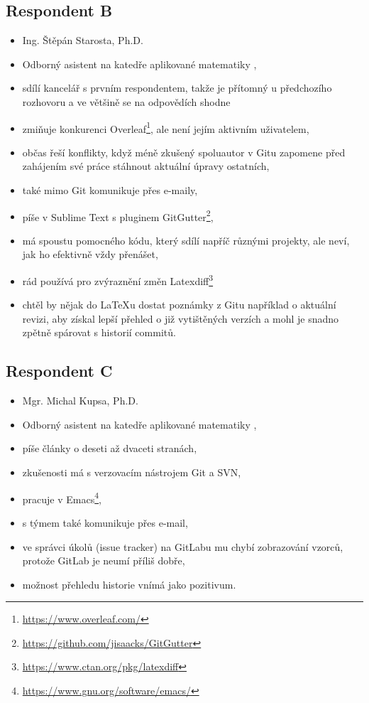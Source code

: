 \subsection{Respondent B}

\begin{itemize}
	\item Ing. Štěpán Starosta, Ph.D.
	\item Odborný asistent na katedře aplikované matematiky \cite{kam},
	\item sdílí kancelář s prvním respondentem, takže je přítomný u předchozího rozhovoru a ve většině se na odpovědích shodne
	\item zmiňuje konkurenci Overleaf\footnote{\url{https://www.overleaf.com/}}, ale není jejím aktivním uživatelem,
	\item občas řeší konflikty, když méně zkušený spoluautor v Gitu zapomene před zahájením své práce stáhnout aktuální úpravy ostatních,
	\item také mimo Git komunikuje přes e-maily,
	\item píše v Sublime Text s pluginem GitGutter\footnote{\url{https://github.com/jisaacks/GitGutter}},
	\item má spoustu pomocného kódu, který sdílí napříč různými projekty, ale neví, jak ho efektivně vždy přenášet,
	\item rád používá pro zvýraznění změn Latexdiff\footnote{\url{https://www.ctan.org/pkg/latexdiff}}
	\item chtěl by nějak do \LaTeX{u} dostat poznámky z Gitu například o aktuální revizi, aby získal lepší přehled o již vytištěných verzích a mohl je snadno zpětně spárovat s historií commitů.
\end{itemize}


\subsection{Respondent C}

\begin{itemize}
	\item Mgr. Michal Kupsa, Ph.D.
	\item Odborný asistent na katedře aplikované matematiky \cite{kam},
	\item píše články o deseti až dvaceti stranách,
	\item zkušenosti má s verzovacím nástrojem Git a SVN,
	\item pracuje v Emacs\footnote{\url{https://www.gnu.org/software/emacs/}},
	\item s týmem také komunikuje přes e-mail,
	\item ve správci úkolů (issue tracker) na GitLabu mu chybí zobrazování vzorců, protože GitLab je neumí příliš dobře,
	\item možnost přehledu historie vnímá jako pozitivum.
\end{itemize}


